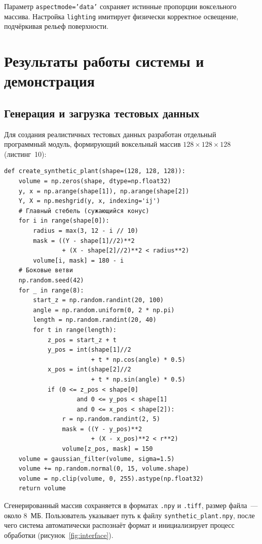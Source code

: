 \documentclass[14pt,a4paper]{extreport}
\begin{document}
Параметр \texttt{aspectmode='data'} сохраняет истинные пропорции воксельного массива. Настройка \texttt{lighting} имитирует физически корректное освещение, подчёркивая рельеф поверхности.

\section{Результаты работы системы и демонстрация}

\subsection{Генерация и загрузка тестовых данных}

Для создания реалистичных тестовых данных разработан отдельный программный модуль, формирующий воксельный массив $128 \times 128 \times 128$ (листинг~10):

\begin{lstlisting}[caption={Генерация синтетической томограммы растения в скрипте generate\_data.py}]
def create_synthetic_plant(shape=(128, 128, 128)):
    volume = np.zeros(shape, dtype=np.float32)
    y, x = np.arange(shape[1]), np.arange(shape[2])
    Y, X = np.meshgrid(y, x, indexing='ij')
    # Главный стебель (сужающийся конус)
    for i in range(shape[0]):
        radius = max(3, 12 - i // 10)
        mask = ((Y - shape[1]//2)**2
                + (X - shape[2]//2)**2 < radius**2)
        volume[i, mask] = 180 - i
    # Боковые ветви
    np.random.seed(42)
    for _ in range(8):
        start_z = np.random.randint(20, 100)
        angle = np.random.uniform(0, 2 * np.pi)
        length = np.random.randint(20, 40)
        for t in range(length):
            z_pos = start_z + t
            y_pos = int(shape[1]//2
                        + t * np.cos(angle) * 0.5)
            x_pos = int(shape[2]//2
                        + t * np.sin(angle) * 0.5)
            if (0 <= z_pos < shape[0]
                    and 0 <= y_pos < shape[1]
                    and 0 <= x_pos < shape[2]):
                r = np.random.randint(2, 5)
                mask = ((Y - y_pos)**2
                        + (X - x_pos)**2 < r**2)
                volume[z_pos, mask] = 150
    volume = gaussian_filter(volume, sigma=1.5)
    volume += np.random.normal(0, 15, volume.shape)
    volume = np.clip(volume, 0, 255).astype(np.float32)
    return volume
\end{lstlisting}

Сгенерированный массив сохраняется в форматах \texttt{.npy} и \texttt{.tiff}, размер файла~--- около 8~МБ. Пользователь указывает путь к файлу \texttt{synthetic\_plant.npy}, после чего система автоматически распознаёт формат и инициализирует процесс обработки (рисунок~\ref{fig:interface}).
\end{document}
